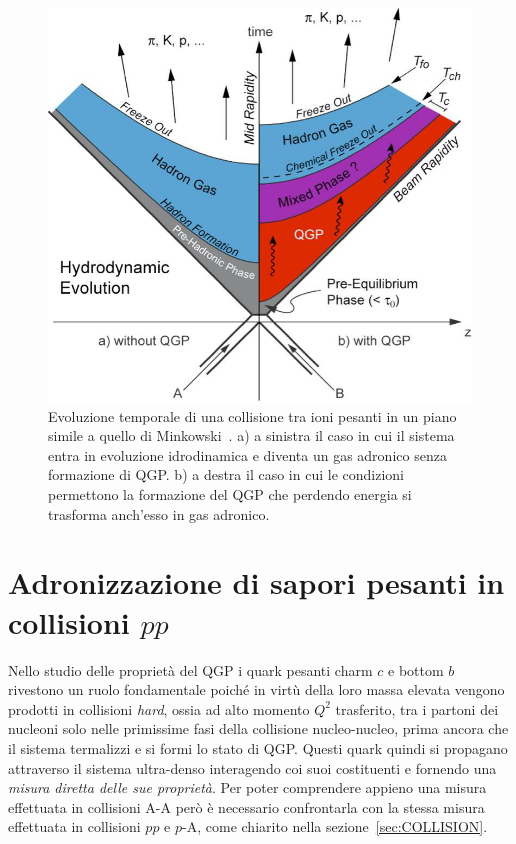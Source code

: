     \begin{figure}[p]
        \centering
        \includegraphics[width=0.9\linewidth]{res/fig/1-chapter/5-TimeEvolQGP.jpg}
        \caption{Evoluzione temporale di una collisione tra ioni pesanti in un piano simile a quello di Minkowski~\cite{RS_2011}. a) a sinistra il caso in cui il sistema entra in evoluzione idrodinamica e diventa un gas adronico senza formazione di QGP. b) a destra il caso in cui le condizioni permettono la formazione del QGP che perdendo energia si trasforma anch'esso in gas adronico.}
        \label{fig:5-time-evol-qgp}
    \end{figure}

\newpage

\section{Adronizzazione di sapori pesanti in collisioni $pp$}
\label{sec:ADRONIZATIONpp}
    Nello studio delle proprietà del QGP i quark pesanti charm $c$ e bottom $b$ rivestono un ruolo fondamentale poiché in virtù della loro massa elevata vengono prodotti in collisioni \textit{hard}, ossia ad alto momento $Q^2$ trasferito, tra i partoni dei nucleoni solo nelle primissime fasi della collisione nucleo-nucleo, prima ancora che il sistema termalizzi e si formi lo stato di QGP. Questi quark quindi si propagano attraverso il sistema ultra-denso interagendo coi suoi costituenti e fornendo una \textit{misura diretta delle sue proprietà}. Per poter comprendere appieno una misura effettuata in collisioni A-A però è necessario confrontarla con la stessa misura effettuata in collisioni $pp$ e $p$-A, come chiarito nella sezione~\ref{sec:COLLISION}.

